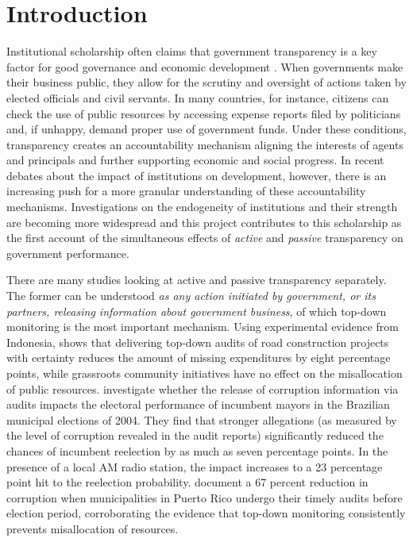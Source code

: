\documentclass[11pt]{article}
\begin{document}
\clearpage

\section{Introduction} \label{sec:introduction_paper3}

Institutional scholarship often claims that government transparency is a key factor for good governance and economic development \citep{KaufmannGovernanceMatters1999,BoRothsteinGoodGovernance2012}. When governments make their business public, they allow for the scrutiny and oversight of actions taken by elected officials and civil servants. In many countries, for instance, citizens can check the use of public resources by accessing expense reports filed by politicians and, if unhappy, demand proper use of government funds. Under these conditions, transparency creates an accountability mechanism aligning the interests of agents and principals and further supporting economic and social progress. In recent debates about the impact of institutions on development, however, there is an increasing push for a more granular understanding of these accountability mechanisms. Investigations on the endogeneity of institutions and their strength \citep{AcemogluChapterInstitutionsFundamental2005,LevitskyVariationInstitutionalStrength2009,DalBoInstitutionsBehaviorExperimental2010} are becoming more widespread and this project contributes to this scholarship as the first account of the simultaneous effects of \emph{active} and \emph{passive} transparency on government performance.

There are many studies looking at active and passive transparency separately. The former can be understood \emph{as any action initiated by government, or its partners, releasing information about government business}, of which top-down monitoring is the most important mechanism. Using experimental evidence from Indonesia, \citet{OlkenMonitoringCorruptionEvidence2007c} shows that delivering top-down audits of road construction projects with certainty reduces the amount of missing expenditures by eight percentage points, while grassroots community initiatives have no effect on the misallocation of public resources. \citet{FerrazExposingCorruptPoliticians2008b} investigate whether the release of corruption information via audits impacts the electoral performance of incumbent mayors in the Brazilian municipal elections of 2004. They find that stronger allegations (as measured by the level of corruption revealed in the audit reports) significantly reduced the chances of incumbent reelection by as much as seven percentage points. In the presence of a local AM radio station, the impact increases to a 23 percentage point hit to the reelection probability. \citet{BobonisMonitoringCorruptiblePoliticians2016} document a 67 percent reduction in corruption when municipalities in Puerto Rico undergo their timely audits before election period, corroborating the evidence that top-down monitoring consistently prevents misallocation of resources.
\end{document}
